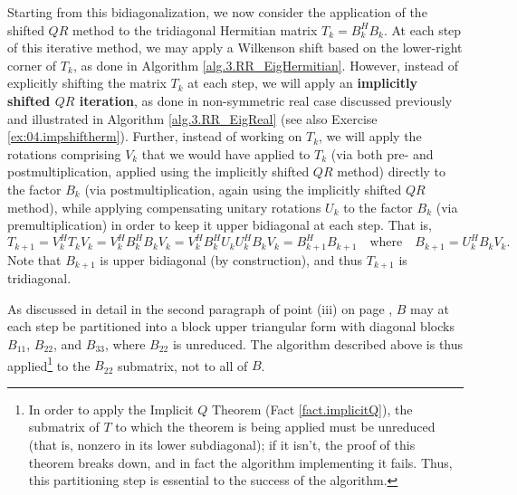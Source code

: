 \begin{figure*}[t]
\end{figure*}

Starting from this bidiagonalization, we now consider the application of the shifted $QR$ method to the
tridiagonal Hermitian matrix $T_k=B_k^H B_k$.  At each step of this iterative method, we may apply a Wilkenson shift based on the lower-right corner of $T_k$,
as done in Algorithm \ref{alg.3.RR_EigHermitian}.  However, instead of explicitly shifting the matrix $T_k$ at each step, we will apply an {\bf implicitly shifted $QR$ iteration},
as done in non-symmetric real case discussed previously and illustrated in Algorithm \ref{alg.3.RR_EigReal} (see also Exercise \ref{ex:04.impshiftherm}).
Further, instead of working on $T_k$, we will apply the rotations comprising $V_k$ that we would have applied to $T_k$ (via both pre- and postmultiplication, applied using the implicitly shifted $QR$ method)
directly to the factor $B_k$ (via postmultiplication, again using the implicitly shifted $QR$ method), while applying compensating unitary rotations $U_k$ to the factor $B_k$
(via premultiplication) in order to keep it upper bidiagonal at each step.
That is,
\begin{equation*}
T_{k+1}=V_k^H T_k V_k = V_k^H B_k^H B_k V_k =  V_k^H B_k^H U_k U_k^H B_k V_k = B_{k+1}^H B_{k+1} \quad\textrm{where}\quad B_{k+1}=U_k^H B_k V_k.
\end{equation*}
Note that $B_{k+1}$ is upper bidiagonal (by construction), and thus $T_{k+1}$ is tridiagonal.  

As discussed in detail in the second paragraph of point (iii) on page \pageref{par:T22isolation}, $B$ may at each step be partitioned into a block upper triangular form
with diagonal blocks $B_{11}$, $B_{22}$, and $B_{33}$, where $B_{22}$ is unreduced.  The algorithm described above is thus
applied\footnote{In order to apply the Implicit $Q$ Theorem (Fact \ref{fact.implicitQ}), the submatrix of $T$ to which the theorem is being applied must be unreduced
(that is, nonzero in its lower subdiagonal); if it isn't, the proof
of this theorem breaks down, and in fact the algorithm implementing it fails. Thus, this partitioning step is essential to the success of the algorithm.}
to the $B_{22}$ submatrix, not to all of $B$.

